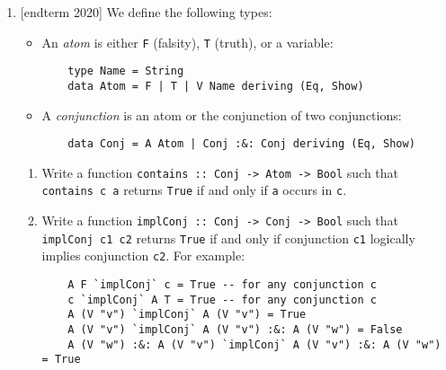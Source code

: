 \documentclass{article}
\def\code#1{\texttt{#1}}
\begin{document}
\begin{enumerate}
    \item {[endterm 2020]} We define the following types:
        \begin{itemize}
            \item An \textit{atom} is either \code{F} (falsity), \code{T} (truth), or a variable:
                \begin{verbatim}
    type Name = String
    data Atom = F | T | V Name deriving (Eq, Show)
                \end{verbatim}
            \item A \textit{conjunction} is an atom or the conjunction of two conjunctions:
                \begin{verbatim}
    data Conj = A Atom | Conj :&: Conj deriving (Eq, Show)
                \end{verbatim}
        \end{itemize}
        \begin{enumerate}
            \item Write a function \code{contains :: Conj -> Atom -> Bool} such that \code{contains c a} returns \code{True} if and only if \code{a} occurs in \code{c}.
            \item Write a function \code{implConj :: Conj -> Conj -> Bool} such that \code{implConj c1 c2} returns \code{True} if and only if conjunction \code{c1} logically implies conjunction \code{c2}. For example:
                \begin{verbatim}
    A F `implConj` c = True -- for any conjunction c
    c `implConj` A T = True -- for any conjunction c
    A (V "v") `implConj` A (V "v") = True
    A (V "v") `implConj` A (V "v") :&: A (V "w") = False
    A (V "w") :&: A (V "v") `implConj` A (V "v") :&: A (V "w") = True
                \end{verbatim}
        \end{enumerate}


\end{enumerate}
\end{document}
